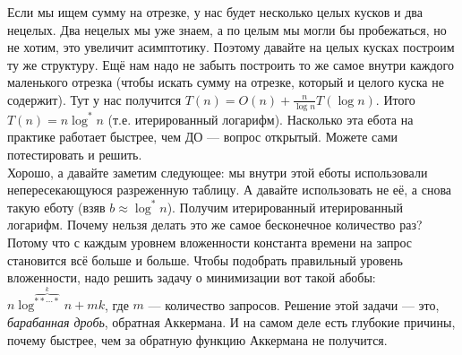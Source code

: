 \documentclass{article}
\newcommand{\pseudo}{PseudoLexer.py:PseudoLexer -x}
\newcommand{\pseudocode}[1]{\texttt{#1}}
\begin{document}
    \begin{center}
    \end{center}
    Если мы ищем сумму на отрезке, у нас будет несколько целых кусков и два нецелых. Два нецелых мы уже знаем, а по целым мы могли бы пробежаться, но не хотим, это увеличит асимптотику. Поэтому давайте на целых кусках построим ту же структуру. Ещё нам надо не забыть построить то же самое внутри каждого маленького отрезка (чтобы искать сумму на отрезке, который и целого куска не содержит). Тут у нас получится $T(n)=O(n)+\frac n{\log n}T(\log n)$. Итого $T(n)=n\log^*n$ (т.е. итерированный логарифм). Насколько эта ебота на практике работает быстрее, чем ДО --- вопрос открытый. Можете сами потестировать и решить.\\
    Хорошо, а давайте заметим следующее: мы внутри этой еботы использовали непересекающуюся разреженную таблицу. А давайте использовать не её, а снова такую еботу (взяв $b\approx\log^*n$). Получим итерированный итерированный логарифм. Почему нельзя делать это же самое бесконечное количество раз? Потому что с каждым уровнем вложенности константа времени на запрос становится всё больше и больше. Чтобы подобрать правильный уровень вложенности, надо решить задачу о минимизации вот такой абобы: $n\log^{\overbrace{{*}{*}\cdots{*}}^k}n+mk$, где $m$ --- количество запросов. Решение этой задачи --- это, \textit{барабанная дробь}, обратная Аккермана. И на самом деле есть глубокие причины, почему быстрее, чем за обратную функцию Аккермана не получится.
\end{document}
